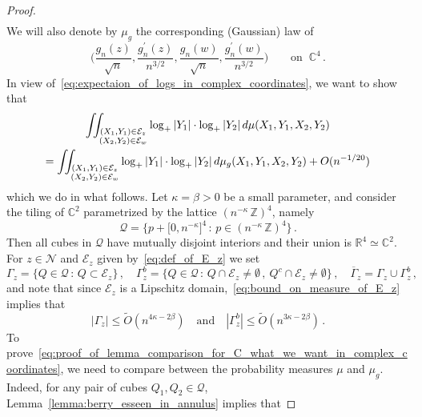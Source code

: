 \documentclass[10pt,a4paper]{amsart}
\def\Ga{{\Gamma}}
\newcommand{\bC}{\mathbb C}
\newcommand{\bR}{\mathbb R}
\newcommand{\bZ}{\mathbb Z}
\newcommand{\cE}{\mathcal{E}}
\newcommand{\cN}{\mathcal N}
\begin{document}
\begin{proof}
\begin{multline}
        \end{multline}
        We will also denote by $\mu_g$ the corresponding (Gaussian) law of 
        \[
        \Big(\frac{g_n(z)}{\sqrt{n}},\frac{g_n^\prime(z)}{n^{3/2}},\frac{g_n(w)}{\sqrt{n}},\frac{g_n^\prime(w)}{n^{3/2}}\Big) \qquad \text{on }  \ \bC^4 \, . 
        \]
        In view of~\eqref{eq:expectaion_of_logs_in_complex_coordinates}, we want to show that 
        \begin{multline}
        \label{eq:proof_of_lemma_comparison_for_C_what_we_want_in_complex_coordinates}
            \iint_{\substack{  (X_1,Y_1)\in \cE_z \\  (X_2,Y_2)\in \cE_w }} \log_+|Y_1| \cdot \log_+|Y_2| \, {\rm d}\mu(X_1,Y_1,X_2,Y_2) \\ = \iint_{\substack{  (X_1,Y_1)\in \cE_z \\  (X_2,Y_2)\in \cE_w }} \log_+|Y_1| \cdot \log_+|Y_2| \, {\rm d}\mu_g(X_1,Y_1,X_2,Y_2) + O(n^{-1/20})
        \end{multline}
        which we do in what follows. Let $\kappa=\beta>0$ be a small parameter, and consider the tiling of $\bC^2$ parametrized by the lattice $(n^{-\kappa} 
 \, \bZ)^4$, namely
        \begin{equation*}
            \mathcal{Q} = \Big\{ p + \big[0,n^{-\kappa}]^{4} \, : \, p\in (n^{-\kappa} \, \bZ)^4 \Big\} \, .
        \end{equation*}
        Then all cubes in $\mathcal{Q}$ have mutually disjoint interiors and their union is $\bR^4 \simeq \bC^2$.  For $z\in \cN$ and $\cE_z$ given by~\eqref{eq:def_of_E_z} we set 
        \begin{equation*}
            \Gamma_z = \big\{ Q\in \mathcal{Q} \, : \, Q\subset \cE_z\big\} \, , \quad 
            \Gamma_z^{b} = \big\{ Q\in \mathcal{Q} \, : \, Q\cap \cE_z \not = \emptyset \, , \ Q^c\cap \cE_z \not=\emptyset \big\}  \, , \quad   \overline \Ga_z = \Ga_z \cup \Ga_z^b \, , 
        \end{equation*}
        and note that since $\cE_z$ is a Lipschitz domain,~\eqref{eq:bound_on_measure_of_E_z} implies that 
        \begin{equation}
        \label{eq:bound_on_caridinality_of_Gamma}
            |\Ga_z| \le \widetilde{O}(n^{4\kappa - 2\beta}) \quad \text{and} \quad |\Ga_z^b| \le  \widetilde{O}(n^{3\kappa-2\beta}) \, .
        \end{equation}                
        To prove~\eqref{eq:proof_of_lemma_comparison_for_C_what_we_want_in_complex_coordinates}, we need to compare between the probability measures $\mu$ and $\mu_g$. Indeed, for any pair of cubes $Q_1,Q_2\in \mathcal{Q}$, Lemma~\ref{lemma:berry_esseen_in_annulus} implies that

\end{proof}
\end{document}
